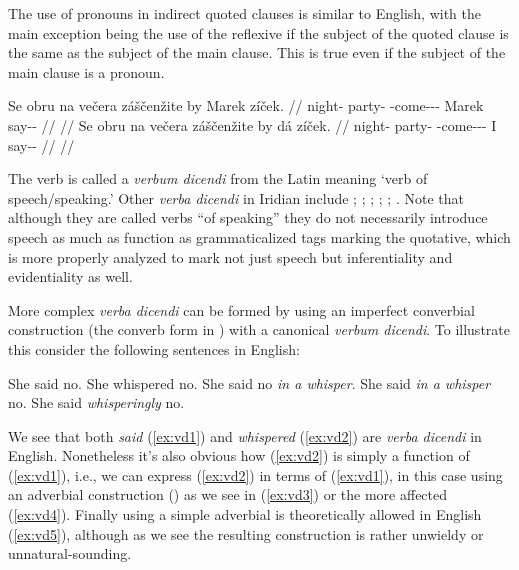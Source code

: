 The use of pronouns in indirect quoted clauses is similar to English, with the
main exception being the use of the reflexive  if the subject of the
quoted clause is the same as the subject of the main clause. This is true even
if the subject of the main clause is a pronoun.

\pex
\a
  \begingl
    \gla Se obru na večera záščenžite by Marek zíček. //
    \glb \Refl{} night-\Ins{} \Loc{} party-\Acc{} \Neg{}-come-\Av{}-\SupP{}-\Cnj{} \Quot{} Marek say-\Av{}-\Pf{} //
    \glft {}//
  \endgl
\a
  \begingl
  \gla Se obru na večera záščenžite by dá zíček. //
  \glb \Refl{} night-\Ins{} \Loc{} party-\Acc{} \Neg{}-come-\Av{}-\SupP{}-\Cnj{} \Quot{} I say-\Av{}-\Pf{} //
  \glft {}//
\endgl
\xe

The verb  is called a \emph{verbum dicendi} from the Latin meaning `verb of speech/speaking.' Other \emph{verba
dicendi} in Iridian include ; ;
; ; ;
. Note that although they are called
verbs ``of speaking'' they do not necessarily introduce speech as much as
function as grammaticalized tags marking the quotative,  which is more properly
analyzed to mark not just speech but inferentiality and evidentiality as well.

More complex \emph{verba dicendi} can be formed by using an imperfect converbial
construction (the converb form in ) with a canonical \emph{verbum
dicendi}. To illustrate this consider the following sentences in English:

\pex[*=?*,interpartskip=0pt]
\a\label{ex:vd1} She said no.
\a\label{ex:vd2} She whispered no.
\a\label{ex:vd3} She said no \emph{in a whisper}.
\a\label{ex:vd4}  She said \emph{in a whisper} no.
\a\label{ex:vd5}  She said \emph{whisperingly} no.
\xe

We see that both \emph{said} (\ref{ex:vd1}) and \emph{whispered} (\ref{ex:vd2})
are \emph{verba dicendi} in English. Nonetheless it's also obvious how
(\ref{ex:vd2}) is simply a function of (\ref{ex:vd1}), i.e., we can express
(\ref{ex:vd2}) in terms of (\ref{ex:vd1}), in this case using an adverbial
construction () as we see in (\ref{ex:vd3}) or the more
affected (\ref{ex:vd4}). Finally using a simple adverbial is theoretically allowed
in English (\ref{ex:vd5}), although as we see the resulting construction is
rather unwieldy or unnatural-sounding.


